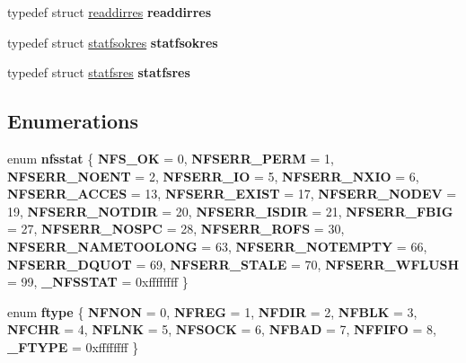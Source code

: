 \begin{DoxyCompactItemize}
typedef struct \mbox{\hyperlink{structreaddirres}{readdirres}} {\bfseries readdirres}
\item 
\mbox{\label{group__libfs__nfsclient__nfs__prot_ga936ccfbae2efd3f84ee34f7a9a2d7577}} 
typedef struct \mbox{\hyperlink{structstatfsokres}{statfsokres}} {\bfseries statfsokres}
\item 
\mbox{\label{group__libfs__nfsclient__nfs__prot_ga5a68e54df92d364023baee3ce2fa54b6}} 
typedef struct \mbox{\hyperlink{structstatfsres}{statfsres}} {\bfseries statfsres}
\end{DoxyCompactItemize}
\subsection*{Enumerations}
\begin{DoxyCompactItemize}
\item 
\mbox{\label{group__libfs__nfsclient__nfs__prot_ga50581379f003865e817ed294021f8258}} 
enum {\bfseries nfsstat} \{ \newline
{\bfseries N\+F\+S\+\_\+\+OK} = 0, 
{\bfseries N\+F\+S\+E\+R\+R\+\_\+\+P\+E\+RM} = 1, 
{\bfseries N\+F\+S\+E\+R\+R\+\_\+\+N\+O\+E\+NT} = 2, 
{\bfseries N\+F\+S\+E\+R\+R\+\_\+\+IO} = 5, 
\newline
{\bfseries N\+F\+S\+E\+R\+R\+\_\+\+N\+X\+IO} = 6, 
{\bfseries N\+F\+S\+E\+R\+R\+\_\+\+A\+C\+C\+ES} = 13, 
{\bfseries N\+F\+S\+E\+R\+R\+\_\+\+E\+X\+I\+ST} = 17, 
{\bfseries N\+F\+S\+E\+R\+R\+\_\+\+N\+O\+D\+EV} = 19, 
\newline
{\bfseries N\+F\+S\+E\+R\+R\+\_\+\+N\+O\+T\+D\+IR} = 20, 
{\bfseries N\+F\+S\+E\+R\+R\+\_\+\+I\+S\+D\+IR} = 21, 
{\bfseries N\+F\+S\+E\+R\+R\+\_\+\+F\+B\+IG} = 27, 
{\bfseries N\+F\+S\+E\+R\+R\+\_\+\+N\+O\+S\+PC} = 28, 
\newline
{\bfseries N\+F\+S\+E\+R\+R\+\_\+\+R\+O\+FS} = 30, 
{\bfseries N\+F\+S\+E\+R\+R\+\_\+\+N\+A\+M\+E\+T\+O\+O\+L\+O\+NG} = 63, 
{\bfseries N\+F\+S\+E\+R\+R\+\_\+\+N\+O\+T\+E\+M\+P\+TY} = 66, 
{\bfseries N\+F\+S\+E\+R\+R\+\_\+\+D\+Q\+U\+OT} = 69, 
\newline
{\bfseries N\+F\+S\+E\+R\+R\+\_\+\+S\+T\+A\+LE} = 70, 
{\bfseries N\+F\+S\+E\+R\+R\+\_\+\+W\+F\+L\+U\+SH} = 99, 
{\bfseries \+\_\+\+N\+F\+S\+S\+T\+AT} = 0xffffffff
 \}
\item 
\mbox{\label{group__libfs__nfsclient__nfs__prot_gae456f8b613bff281440a636849c7b5fa}} 
enum {\bfseries ftype} \{ \newline
{\bfseries N\+F\+N\+ON} = 0, 
{\bfseries N\+F\+R\+EG} = 1, 
{\bfseries N\+F\+D\+IR} = 2, 
{\bfseries N\+F\+B\+LK} = 3, 
\newline
{\bfseries N\+F\+C\+HR} = 4, 
{\bfseries N\+F\+L\+NK} = 5, 
{\bfseries N\+F\+S\+O\+CK} = 6, 
{\bfseries N\+F\+B\+AD} = 7, 
\newline
{\bfseries N\+F\+F\+I\+FO} = 8, 
{\bfseries \+\_\+\+F\+T\+Y\+PE} = 0xffffffff
 \}
\end{DoxyCompactItemize}
